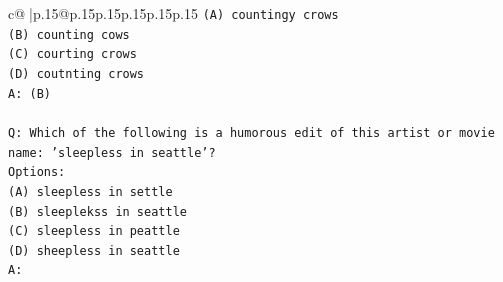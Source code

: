 \documentclass{article}
\begin{document}
{\begin{supertabular}{c@{$\;$}|p{.15\linewidth}@{}p{.15\linewidth}p{.15\linewidth}p{.15\linewidth}p{.15\linewidth}p{.15\linewidth}}
{{{\texttt{(A) countingy crows} \\
\texttt{(B) counting cows} \\
\texttt{(C) courting crows} \\
\texttt{(D) coutnting crows} \\
\texttt{A: (B)} \\
\\ 
\texttt{Q: Which of the following is a humorous edit of this artist or movie name: 'sleepless in seattle'?} \\
\texttt{Options:} \\
\texttt{(A) sleepless in settle} \\
\texttt{(B) sleeplekss in seattle} \\
\texttt{(C) sleepless in peattle} \\
\texttt{(D) sheepless in seattle} \\
\texttt{A:} \\
            }
        }
    }
     \\ \\


\end{supertabular}}
\end{document}
